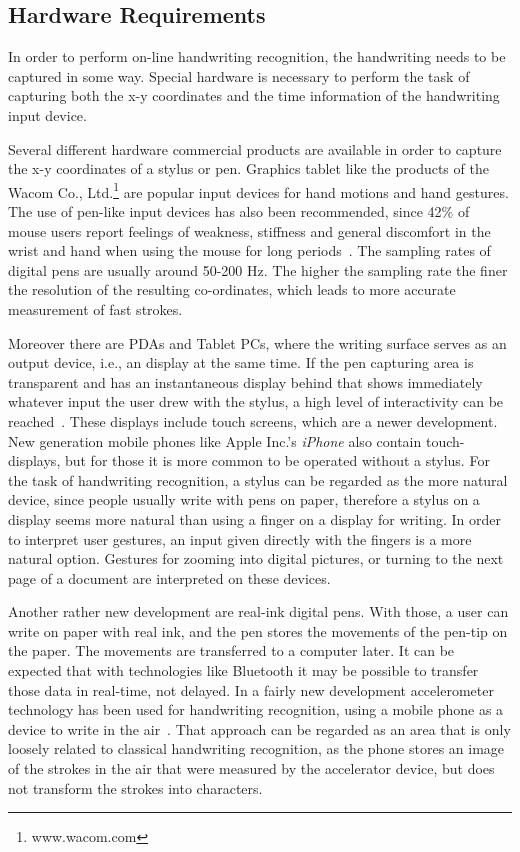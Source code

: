 \subsection{Hardware Requirements}
\label{sec:hardwarerequirements}

In order to perform on-line handwriting recognition, the handwriting needs to 
be captured in some way. Special hardware is necessary to perform the task of
capturing both the x-y coordinates and the time information of the handwriting
input device.

Several different hardware commercial products are available in order to
capture the x-y coordinates of a stylus or pen. Graphics tablet like the
products of the Wacom Co., Ltd.\footnote{www.wacom.com} are popular input
devices for hand motions and hand gestures. The use of pen-like input devices 
has also been recommended, since 42\% of mouse users report feelings of 
weakness, stiffness and general discomfort in the wrist and hand when 
using the mouse for long periods~. 
The sampling rates of digital pens are usually around 50-200 Hz. The higher the
sampling rate the finer the resolution of the resulting co-ordinates,
which leads to more accurate measurement of fast strokes. 

Moreover there are PDAs and Tablet PCs, where the writing surface serves 
as an output device, i.e., an display at the same time.
If the pen capturing area is transparent and has an instantaneous display behind
that shows immediately whatever input the user drew with the stylus,
a high level of interactivity can be reached~. 
These displays include touch screens, which are a newer development. 
New generation mobile phones like Apple Inc.'s \emph{iPhone} 
also contain touch-displays, but for those it is more common to be 
operated without a stylus. For the task of handwriting recognition, 
a stylus can be regarded as the more natural device, 
since people usually write with pens on paper,
therefore a stylus on a display seems more natural than using a 
finger on a display for writing. 
In order to interpret user gestures, an input given directly with the fingers
is a more natural option. Gestures for zooming into digital pictures, 
or turning to the next page of a document are interpreted on these devices.

Another rather new development are real-ink digital pens. With those, 
a user can write on paper with real ink, and the pen stores the 
movements of the pen-tip on the paper. The movements are transferred to a 
computer later. 
It can be expected that with technologies like Bluetooth it may be possible 
to transfer those data in real-time, not delayed.
In a fairly new development accelerometer technology has been used 
for handwriting recognition, using a mobile phone as a device to write 
in the air~. That approach can be regarded as an area 
that is only loosely related to classical handwriting recognition, 
as the phone stores an image of the strokes in the air that were measured
by the accelerator device, but does not transform the strokes into characters.

